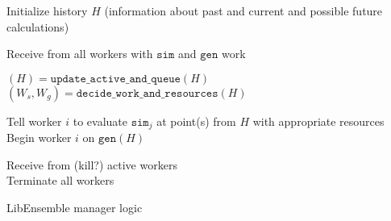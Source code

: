 \documentclass{article}
\begin{document}
\newpage
\LinesNumbered
\begin{algorithm}[t] %
  Initialize history $H$ (information about past and current and possible future calculations)\\

  {
    {
      Receive from all workers with $\mathtt{sim}$ and $\mathtt{gen}$ work\\
    }

    $(H) = \mathtt{update\_active\_and\_queue}(H)$
    $(W_s, W_g) = \mathtt{decide\_work\_and\_resources}(H)$

    {
      {
      Tell worker $i$ to evaluate $\mathtt{sim}_j$ at point(s) from $H$ with appropriate resources
      }{
      Begin worker $i$ on $\mathtt{gen}(H)$\\
      }
    }
  }
  Receive from (kill?) active workers\\ 
  Terminate all workers
  \caption{LibEnsemble manager logic \label{alg:manager}} 
\end{algorithm}
\end{document}
